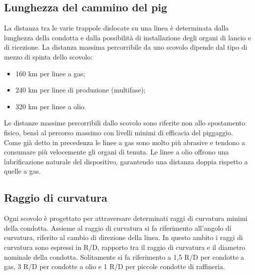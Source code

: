 \subsection{Lunghezza del cammino del pig}
La distanza tra le varie trappole dislocate su una linea è determinata dalla lunghezza della condotta e dalla possibilità di installazione degli organi di lancio e di ricezione. La distanza massima percorribile da uno scovolo dipende dal tipo di mezzo di spinta dello scovolo:
\begin{itemize}
    \item 160 km per linee a gas;
    \item 240 km per linee di produzione (multifase);
    \item 320 km per linee a olio.
\end{itemize}
Le distanze massime percorribili dallo scovolo sono riferite non allo spostamento fisico, bensì al percorso massimo con livelli minimi di efficacia del piggaggio. Come già detto in precedenza le linee a gas sono molto più abrasive e tendono a consumare più velocemente gli organi di tenuta. Le linee a olio offrono una lubrificazione naturale del dispositivo, garantendo una distanza doppia rispetto a quelle a gas.

\subsection{Raggio di curvatura}
Ogni scovolo è progettato per attraversare determinati raggi di curvatura minimi della condotta. Assieme al raggio di curvatura si fa riferimento all'angolo di curvatura, riferito al cambio di direzione della linea. In questo ambito i raggi di curvatura sono espressi in R/D, rapporto tra il raggio di curvatura e il diametro nominale della condotta. Solitamente si fa riferimento a 1,5 R/D per condotte a gas, 3 R/D per condotte a olio e 1 R/D per piccole condotte di raffineria.
